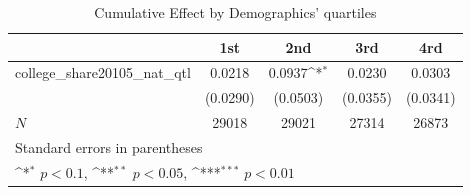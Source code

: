 \begin{table}[htbp]\centering
\def\sym#1{\ifmmode^{#1}\else\(^{#1}\)\fi}
\caption{Cumulative Effect by Demographics' quartiles}
\begin{tabular}{l*{4}{c}}
\hline\hline
            &\multicolumn{1}{c}{1st}&\multicolumn{1}{c}{2nd}&\multicolumn{1}{c}{3rd}&\multicolumn{1}{c}{4rd}\\
\hline
college\_share20105\_nat\_qtl&      0.0218         &      0.0937\sym{*}  &      0.0230         &      0.0303         \\
            &    (0.0290)         &    (0.0503)         &    (0.0355)         &    (0.0341)         \\
\hline
\(N\)       &       29018         &       29021         &       27314         &       26873         \\
\hline\hline
\multicolumn{5}{l}{\footnotesize Standard errors in parentheses}\\
\multicolumn{5}{l}{\footnotesize \sym{*} \(p<0.1\), \sym{**} \(p<0.05\), \sym{***} \(p<0.01\)}\\
\end{tabular}
\end{table}

